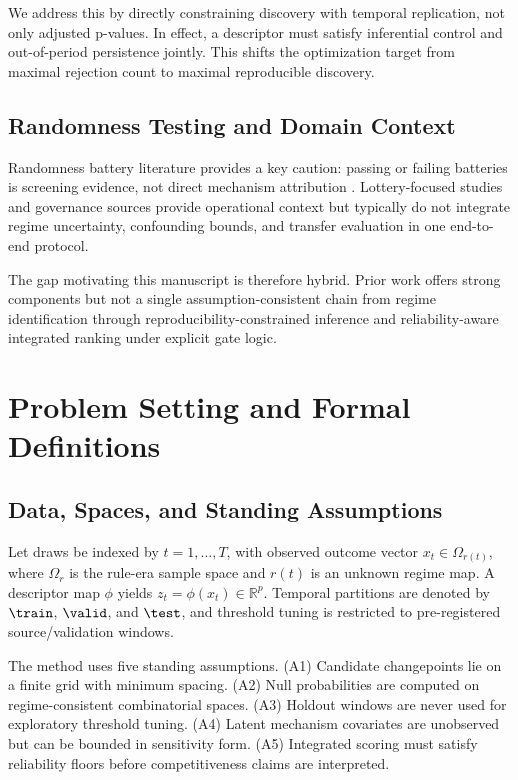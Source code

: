 \documentclass{article} %
\begin{document}
We address this by directly constraining discovery with temporal replication, not only adjusted p-values. In effect, a descriptor must satisfy inferential control and out-of-period persistence jointly. This shifts the optimization target from maximal rejection count to maximal reproducible discovery.

\subsection{Randomness Testing and Domain Context}
Randomness battery literature provides a key caution: passing or failing batteries is screening evidence, not direct mechanism attribution \citep{S20,S21,S24,S38}. Lottery-focused studies \citep{S29,S30} and governance sources \citep{S32,S33,S34,S35,S36} provide operational context but typically do not integrate regime uncertainty, confounding bounds, and transfer evaluation in one end-to-end protocol.

The gap motivating this manuscript is therefore hybrid. Prior work offers strong components but not a single assumption-consistent chain from regime identification through reproducibility-constrained inference and reliability-aware integrated ranking under explicit gate logic.

\section{Problem Setting and Formal Definitions}\label{sec:problem}
\subsection{Data, Spaces, and Standing Assumptions}
Let draws be indexed by $t=1,\ldots,T$, with observed outcome vector $x_t\in\Omega_{r(t)}$, where $\Omega_r$ is the rule-era sample space and $r(t)$ is an unknown regime map. A descriptor map $\phi$ yields $z_t=\phi(x_t)\in\mathbb{R}^p$. Temporal partitions are denoted by $\train$, $\valid$, and $\test$, and threshold tuning is restricted to pre-registered source/validation windows.

The method uses five standing assumptions. (A1) Candidate changepoints lie on a finite grid with minimum spacing. (A2) Null probabilities are computed on regime-consistent combinatorial spaces. (A3) Holdout windows are never used for exploratory threshold tuning. (A4) Latent mechanism covariates are unobserved but can be bounded in sensitivity form. (A5) Integrated scoring must satisfy reliability floors before competitiveness claims are interpreted.
\end{document}
